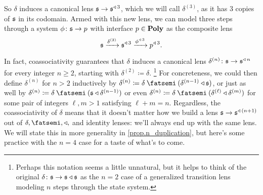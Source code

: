 \documentclass[Book-Poly]{subfiles}
\begin{document}
So $\delta$ induces a canonical lens $\mathfrak{s}\to\mathfrak{s}^{\mathbin{\triangleleft}\,3}$, which we will call $\delta^{(3)}$, as it has $3$ copies of $\mathfrak{s}$ in its codomain.
Armed with this new lens, we can model three steps through a system $\phi\colon\mathfrak{s}\to p$ with interface $p\in\mathbf{Poly}$ as the composite lens
\[
    \mathfrak{s}\xrightarrow{\delta^{(3)}}\mathfrak{s}^{\mathbin{\triangleleft}\,3}\xrightarrow{\phi^{\mathbin{\triangleleft}\,3}}p^{\mathbin{\triangleleft}\,3}.
\]

In fact, coassociativity guarantees that $\delta$ induces a canonical lens $\delta^{(n)}\colon\mathfrak{s}\to\mathfrak{s}^{\mathbin{\triangleleft}\,n}$ for every integer $n\geq2$, starting with $\delta^{(2)}\coloneqq\delta$.%
\footnote{Perhaps this notation seems a little unnatural, but it helps to think of the original $\delta\colon\mathfrak{s}\to\mathfrak{s}\mathbin{\triangleleft}\mathfrak{s}$ as the $n=2$ case of a generalized transition lens modeling $n$ steps through the state system.}
For concreteness, we could then define $\delta^{(n)}$ for $n>2$ inductively by $\delta^{(n)}\coloneqq\delta\then(\delta^{(n-1)}\tri\ema{s})$, or just as well by $\delta^{(n)}\coloneqq\delta\then(\ema{s}\tri\delta^{(n-1)})$ or even $\delta^{(n)}\coloneqq\delta\then(\delta^{(\ell)}\tri\delta^{(m)})$ for some pair of integers $\ell,m>1$ satisfying $\ell+m=n$.
Regardless, the coassociativity of $\delta$ means that it doesn't matter how we build a lens $\mathfrak{s}\to\mathfrak{s}^{\mathbin{\triangleleft}\,(n+1)}$ out of $\delta,\then,\tri,$ and identity lenses: we'll always end up with the same lens.
We will state this in more generality in \cref{prop.n_duplication}, but here's some practice with the $n=4$ case for a taste of what's to come. %
\end{document}
